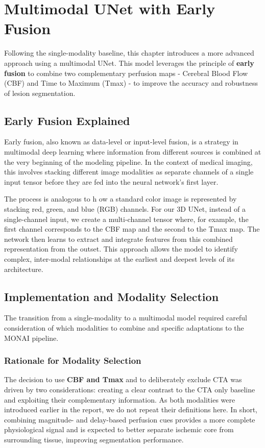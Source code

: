 \chapter{Multimodal UNet with Early Fusion}
\label{ch:early_fusion_model}
Following the single-modality baseline, this chapter introduces a more advanced approach using a multimodal UNet. This model leverages the principle of \textbf{early fusion} to combine two complementary perfusion maps - Cerebral Blood Flow (CBF) and Time to Maximum (Tmax) - to improve the accuracy and robustness of lesion segmentation.

\section{Early Fusion Explained}
\label{sec:early_fusion_explained}
Early fusion, also known as data-level or input-level fusion, is a strategy in multimodal deep learning where information from different sources is combined at the very beginning of the modeling pipeline. In the context of medical imaging, this involves stacking different image modalities as separate channels of a single input tensor before they are fed into the neural network's first layer.

The process is analogous to h ow a standard color image is represented by stacking red, green, and blue (RGB) channels. For our 3D UNet, instead of a single-channel input, we create a multi-channel tensor where, for example, the first channel corresponds to the CBF map and the second to the Tmax map. The network then learns to extract and integrate features from this combined representation from the outset. This approach allows the model to identify complex, inter-modal relationships at the earliest and deepest levels of its architecture.



\section{Implementation and Modality Selection}
\label{sec:implementation_fusion}
The transition from a single-modality to a multimodal model required careful consideration of which modalities to combine and specific adaptations to the MONAI pipeline.

\subsection{Rationale for Modality Selection}
\label{subsec:modality_rationale} 
The decision to use \textbf{CBF and Tmax} and to deliberately exclude CTA was driven by two considerations: creating a clear contrast to the CTA only baseline and exploiting their complementary information. As both modalities were introduced earlier in the report, we do not repeat their definitions here. In short, combining magnitude- and delay-based perfusion cues provides a more complete physiological signal and is expected to better separate ischemic core from surrounding tissue, improving segmentation performance.

